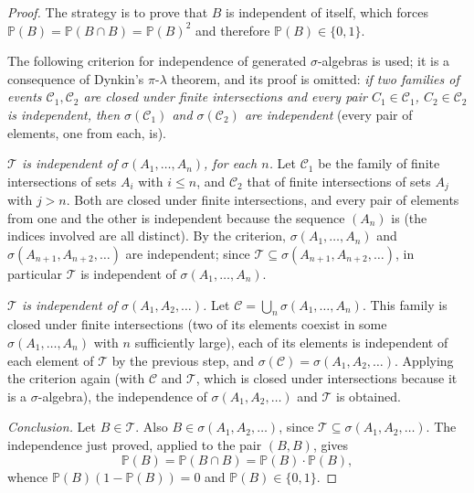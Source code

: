 \documentclass[11pt, a4paper]{article}
\begin{document}
\begin{proof}
The strategy is to prove that $B$ is independent of itself, which forces $\mathbb{P}(B) =
\mathbb{P}(B \cap B) = \mathbb{P}(B)^2$ and therefore $\mathbb{P}(B) \in \{0, 1\}$.

The following criterion for independence of generated $\sigma$-algebras is used; it is a consequence of
Dynkin's $\pi$-$\lambda$ theorem, and its proof is omitted: \emph{if two families of events
$\mathcal{C}_1, \mathcal{C}_2$ are closed under finite intersections and every pair $C_1 \in
\mathcal{C}_1$, $C_2 \in \mathcal{C}_2$ is independent, then $\sigma(\mathcal{C}_1)$ and
$\sigma(\mathcal{C}_2)$ are independent} (every pair of elements, one from each, is).

\textit{$\mathcal{T}$ is independent of $\sigma(A_1, \dots, A_n)$, for each $n$.} Let
$\mathcal{C}_1$ be the family of finite intersections of sets $A_i$ with $i \le n$, and
$\mathcal{C}_2$ that of finite intersections of sets $A_j$ with $j > n$. Both are
closed under finite intersections, and every pair of elements from one and the other is independent
because the sequence $(A_n)$ is (the indices involved are all distinct). By the
criterion, $\sigma(A_1, \dots, A_n)$ and $\sigma(A_{n+1}, A_{n+2}, \dots)$ are independent; since
$\mathcal{T} \subseteq \sigma(A_{n+1}, A_{n+2}, \dots)$, in particular $\mathcal{T}$ is
independent of $\sigma(A_1, \dots, A_n)$.

\textit{$\mathcal{T}$ is independent of $\sigma(A_1, A_2, \dots)$.} Let $\mathcal{C} =
\bigcup_n \sigma(A_1, \dots, A_n)$. This family is closed under finite intersections (two
of its elements coexist in some $\sigma(A_1, \dots, A_n)$ with $n$ sufficiently large),
each of its elements is independent of each element of $\mathcal{T}$ by the previous step, and
$\sigma(\mathcal{C}) = \sigma(A_1, A_2, \dots)$. Applying the criterion again (with
$\mathcal{C}$ and $\mathcal{T}$, which is closed under intersections because it is a $\sigma$-algebra),
the independence of $\sigma(A_1, A_2, \dots)$ and $\mathcal{T}$ is obtained.

\textit{Conclusion.} Let $B \in \mathcal{T}$. Also $B \in \sigma(A_1, A_2, \dots)$, since
$\mathcal{T} \subseteq \sigma(A_1, A_2, \dots)$. The independence just proved, applied to the
pair $(B, B)$, gives
$$ \mathbb{P}(B) = \mathbb{P}(B \cap B) = \mathbb{P}(B) \cdot \mathbb{P}(B), $$
whence $\mathbb{P}(B)(1 - \mathbb{P}(B)) = 0$ and $\mathbb{P}(B) \in \{0, 1\}$.
\end{proof}
\end{document}
